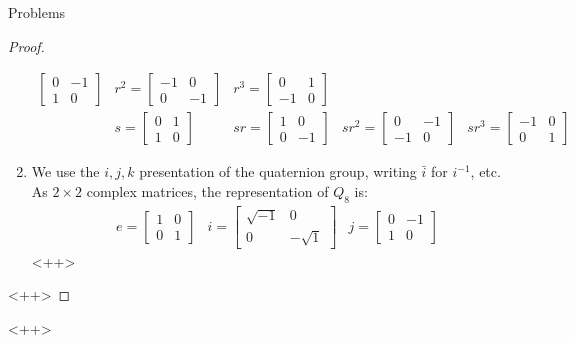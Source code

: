 \documentclass[12pt]{article}
\theoremstyle{definition}
\begin{document}
\begin{section}{Problems}
\begin{proof}
\begin{enumerate}[label=(\alph*)]
\begin{align*}
\begin{bmatrix}
					 0 & -1 \\ 1 & 0
				 \end{bmatrix} &r^2 = \begin{bmatrix}
					 -1 & 0 \\0 & -1
				 \end{bmatrix} & r^3 = \begin{bmatrix}
					 0 & 1\\-1 & 0
				 \end{bmatrix}\\ & s = \begin{bmatrix}
					 0 & 1 \\1 & 0
				 \end{bmatrix} & sr = \begin{bmatrix}
					 1 & 0 \\ 0 & -1
				 \end{bmatrix} & sr^2 = \begin{bmatrix}
					 0 & -1 \\ -1 & 0
				 \end{bmatrix} & sr^3 = \begin{bmatrix}
					 -1 & 0 \\0 & 1
				 \end{bmatrix}
			\end{align*}
		\item We use the $i,j,k$ presentation of the quaternion group, writing $\bar{i}$ for $i^{-1}$, etc. As $2 \times 2$ complex matrices, the representation of $Q_8$ is:
			\begin{align*}
				&e = \begin{bmatrix}
					1 & 0 \\ 0 & 1
				\end{bmatrix} &i = \begin{bmatrix}
					\sqrt{-1} & 0 \\0 & -\sqrt{1}
				\end{bmatrix} &j = \begin{bmatrix}
					0 & -1 \\ 1 & 0
				\end{bmatrix}
			\end{align*}<++>
	\end{enumerate}<++>
\end{proof}<++>
\end{section}
\end{document}
